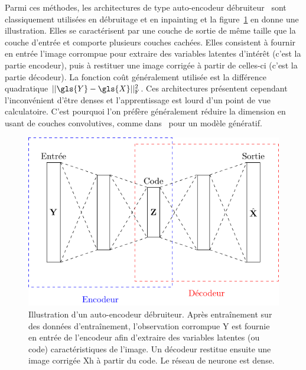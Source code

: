 Parmi ces méthodes, les architectures de type auto-encodeur débruiteur~\cite{vincent2010stacked,xie2012image} sont classiquement utilisées en débruitage et en inpainting et la figure~\ref{fig-denoising_deep} en donne une illustration. Elles se caractérisent par une couche de sortie de même taille que la couche d'entrée et comporte plusieurs couches cachées. Elles consistent à fournir en entrée l'image corrompue pour extraire des variables latentes d'intérêt (c'est la partie encodeur), puis à restituer une image corrigée à partir de celles-ci (c'est la partie décodeur). La fonction coût généralement utilisée est la différence quadratique $\frobnorm{\gls{Y}-\gls{X}}$. Ces architectures présentent cependant l'inconvénient d'être denses et l'apprentissage est lourd d'un point de vue calculatoire. C'est pourquoi l'on préfère généralement réduire la dimension en usant de couches convolutives, comme dans~\cite{iizuka2017globally} pour un modèle génératif.
%
\begin{figure}
    \centering
    \includegraphics{img/chapitre2/figure6/denoising_deep.pdf}
    \caption{Illustration d'un auto-encodeur débruiteur. Après entraînement sur des données d'entraînement, l'observation corrompue \gls{Y} est fournie en entrée de l'encodeur afin d'extraire des variables latentes (ou code) caractéristiques de l'image. Un décodeur restitue ensuite une image corrigée \gls{Xh} à partir du code. Le réseau de neurone est dense.
        \protect\label{fig-denoising_deep}}
\end{figure}

